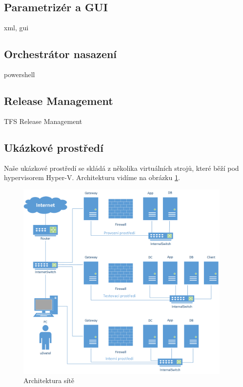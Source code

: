 \subsection{Parametrizér a GUI}
xml, gui

\subsection{Orchestrátor nasazení}
powershell

\subsection{Release Management}
TFS Release Management

\subsection{Ukázkové prostředí}
Naše ukázkové prostředí se skládá z několika virtuálních strojů, které běží pod hypervisorem Hyper-V. Architekturu vidíme na obrázku \ref{fig:architekturasite}. 

\begin{figure}[]
  \centering
  \includegraphics[height=10cm]{fig/network.png}
  \caption{Architektura sítě}
  \label{fig:architekturasite}
\end{figure}

